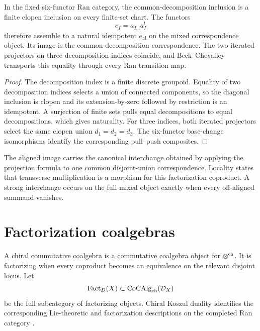 \begin{theorem}
In the fixed six-functor Ran category, the common-decomposition inclusion is a finite clopen inclusion on every finite-set chart.  The functors
\[
 e_I=a_{I,!}a_I^!
\]
therefore assemble to a natural idempotent $e_{\mathrm{al}}$ on the mixed correspondence object.  Its image is the common-decomposition correspondence.  The two iterated projectors on three decomposition indices coincide, and Beck--Chevalley transports this equality through every Ran transition map.
\end{theorem}
\begin{proof}
The decomposition index is a finite discrete groupoid.  Equality of two decomposition indices selects a union of connected components, so the diagonal inclusion is clopen and its extension-by-zero followed by restriction is an idempotent.  A surjection of finite sets pulls equal decompositions to equal decompositions, which gives naturality.  For three indices, both iterated projectors select the same clopen union $d_1=d_2=d_3$.  The six-functor base-change isomorphisms identify the corresponding pull--push composites.
\end{proof}

The aligned image carries the canonical interchange obtained by applying the projection formula to one common disjoint-union correspondence.  Locality states that transverse multiplication is a morphism for this factorization coproduct.  A strong interchange occurs on the full mixed object exactly when every off-aligned summand vanishes.

\section{Factorization coalgebras}
A chiral commutative coalgebra is a commutative coalgebra object for $\otimes^{\mathrm{ch}}$. It is factorizing when every coproduct becomes an equivalence on the relevant disjoint locus. Let
\[
 \operatorname{Fact}_D(X)\subset \operatorname{CoCAlg}_{\mathrm{ch}}(\mathcal D_X)
\]
be the full subcategory of factorizing objects. Chiral Koszul duality identifies the corresponding Lie-theoretic and factorization descriptions on the completed Ran category \cite{FG12,Heuts}.

